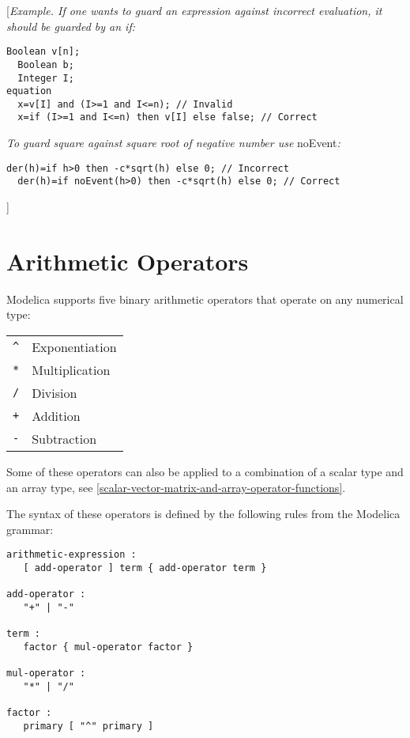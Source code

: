 {[}\emph{Example. If one wants to guard an expression against incorrect
evaluation, it should be guarded by an if:}

\begin{lstlisting}[language=modelica]
  Boolean v[n];
  Boolean b;
  Integer I;
equation
  x=v[I] and (I>=1 and I<=n); // Invalid
  x=if (I>=1 and I<=n) then v[I] else false; // Correct
\end{lstlisting}

\emph{To guard square against square root of negative number use}
noEvent\emph{:}
\begin{lstlisting}[language=modelica]
  der(h)=if h>0 then -c*sqrt(h) else 0; // Incorrect
  der(h)=if noEvent(h>0) then -c*sqrt(h) else 0; // Correct
\end{lstlisting}
{]}

\section{Arithmetic Operators}

Modelica supports five binary arithmetic operators that operate on any
numerical type:

\begin{longtable}[c]{ll}
\lstinline[basicstyle=\ttfamily]!^! & Exponentiation\\
\lstinline[basicstyle=\ttfamily]!*! & Multiplication\\ 
\lstinline[basicstyle=\ttfamily]!/! & Division\\ 
\lstinline[basicstyle=\ttfamily]!+! & Addition\\ 
\lstinline[basicstyle=\ttfamily]!-! & Subtraction\\
\end{longtable}

Some of these operators can also be applied to a combination of a scalar
type and an array type, see \autoref{scalar-vector-matrix-and-array-operator-functions}.

The syntax of these operators is defined by the following rules from the
Modelica grammar:

\begin{lstlisting}[language=grammar]
arithmetic-expression :
   [ add-operator ] term { add-operator term }

add-operator :
   "+" | "-"
   
term :
   factor { mul-operator factor }

mul-operator :
   "*" | "/"
   
factor :
   primary [ "^" primary ]
\end{lstlisting}

